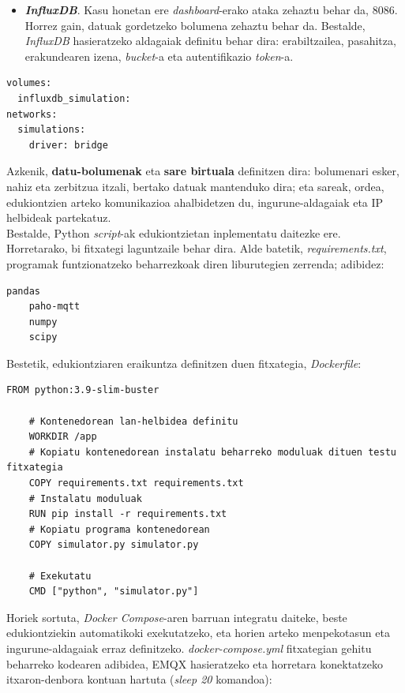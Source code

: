 \documentclass[12pt]{article}
\numberwithin{figure}{section}
\numberwithin{equation}{section}
\begin{document}
\begin{itemize}
    \item \textbf{\textit{InfluxDB}}. Kasu honetan ere \textit{dashboard}-erako ataka zehaztu behar da, 8086. Horrez gain, datuak gordetzeko bolumena zehaztu behar da. Bestalde, \textit{InfluxDB} hasieratzeko aldagaiak definitu behar dira: erabiltzailea, pasahitza, erakundearen izena, \textit{bucket}-a eta autentifikazio \textit{token}-a.
\end{itemize}

\begin{verbatim}
volumes:
  influxdb_simulation:
networks:
  simulations:
    driver: bridge
\end{verbatim}

Azkenik, \textbf{datu-bolumenak} eta \textbf{sare birtuala} definitzen dira: bolumenari esker, nahiz eta zerbitzua itzali, bertako datuak mantenduko dira; eta sareak, ordea, edukiontzien arteko komunikazioa ahalbidetzen du, ingurune-aldagaiak eta IP helbideak partekatuz.\\

Bestalde, Python \textit{script}-ak edukiontzietan inplementatu daitezke ere. Horretarako, bi fitxategi laguntzaile behar dira. Alde batetik, \textit{requirements.txt}, programak funtzionatzeko beharrezkoak diren liburutegien zerrenda; adibidez:

\begin{Verbatim}[fontsize=\footnotesize]
    pandas
    paho-mqtt
    numpy
    scipy  
\end{Verbatim}

Bestetik, edukiontziaren eraikuntza definitzen duen fitxategia, \textit{Dockerfile}:

\begin{Verbatim}[fontsize=\footnotesize]
    FROM python:3.9-slim-buster

    # Kontenedorean lan-helbidea definitu
    WORKDIR /app
    # Kopiatu kontenedorean instalatu beharreko moduluak dituen testu fitxategia
    COPY requirements.txt requirements.txt
    # Instalatu moduluak
    RUN pip install -r requirements.txt
    # Kopiatu programa kontenedorean
    COPY simulator.py simulator.py

    # Exekutatu
    CMD ["python", "simulator.py"]
\end{Verbatim}

Horiek sortuta, \textit{Docker Compose}-aren barruan integratu daiteke, beste edukiontziekin automatikoki exekutatzeko, eta horien arteko menpekotasun eta ingurune-aldagaiak erraz definitzeko. \textit{docker-compose.yml} fitxategian gehitu beharreko kodearen adibidea, EMQX hasieratzeko eta horretara konektatzeko itxaron-denbora kontuan hartuta (\textit{sleep 20} komandoa):
\end{document}
